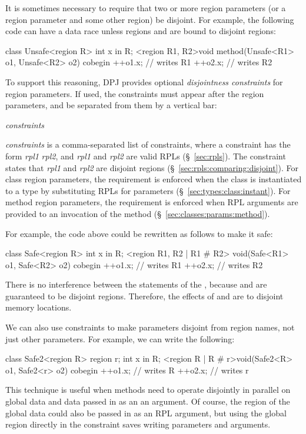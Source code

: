 It is sometimes necessary to require that two or more region
parameters (or a region parameter and some other region) be disjoint.
For example, the following code can have a data race unless regions
 and  are bound to disjoint regions:
%
\begin{dpjlisting}
class Unsafe<region R> {
  int x in R;
  <region R1, R2>void method(Unsafe<R1> o1, Unsafe<R2> o2) {
    cobegin {
      ++o1.x; // writes R1
      ++o2.x; // writes R2
    }
  }
}
\end{dpjlisting}
%
To support this reasoning, DPJ provides optional \emph{disjointness
  constraints} for region parameters.  If used, the constraints must
appear after the region parameters, and be separated from them by a
vertical bar:
%
\begin{description}
\item {} \emph{constraints} \kwd{>}
\end{description}
%
\emph{constraints} is a comma-separated list of constraints, where a
constraint has the form \emph{rpl1} \kwd{\#} \emph{rpl2}, and
\emph{rpl1} and \emph{rpl2} are valid RPLs (\S~\ref{sec:rpls}).  The
constraint states that \emph{rpl1} and \emph{rpl2} are disjoint
regions (\S~\ref{sec:rpls:comparing:disjoint}).  For class region
parameters, the requirement is enforced when the class is instantiated
to a type by substituting RPLs for parameters
(\S~\ref{sec:types:class:instant}).  For method region parameters, the
requirement is enforced when RPL arguments are provided to an
invocation of the method (\S~\ref{sec:classes:params:method}).

For example, the code above could be rewritten as follows to make it
safe:
%
\begin{dpjlisting}
class Safe<region R> {
  int x in R;
  <region R1, R2 | R1 # R2> void(Safe<R1> o1, Safe<R2> o2) {
    cobegin {
      ++o1.x; // writes R1
      ++o2.x; // writes R2
    }
  }
}
\end{dpjlisting}
%
There is no interference between the statements of the ,
because  and  are guaranteed to be disjoint regions.
Therefore, the effects of  and  are to
disjoint memory locations.

We can also use constraints to make parameters disjoint from region
names, not just other parameters.  For example, we can write the
following:
%
\begin{dpjlisting}
class Safe2<region R> {
  region r;
  int x in R;
  <region R | R # r>void(Safe2<R> o1, Safe2<r> o2) {
    cobegin {
      ++o1.x; // writes R
      ++o2.x; // writes r
    }
  }
}
\end{dpjlisting}
%
This technique is useful when methods need to operate disjointly in
parallel on global data and data passed in as an an argument.  Of
course, the region of the global data could also be passed in as an
RPL argument, but using the global region directly in the constraint
saves writing parameters and arguments.

